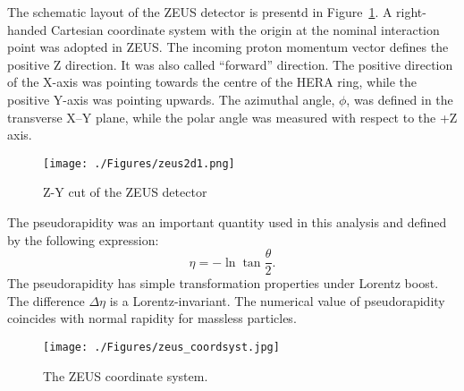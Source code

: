 The schematic layout of the ZEUS detector is presentd in Figure~\ref{fig:zeus2d1}. A right-handed Cartesian coordinate system with the origin at the nominal interaction point was adopted in ZEUS. The incoming proton momentum vector defines the positive Z direction. It was also called ``forward'' direction. The positive direction of the X-axis was pointing towards the centre of the HERA ring, while the positive Y-axis was pointing upwards. The azimuthal angle, $\phi$, was defined in the transverse X--Y plane, while the polar angle was measured with respect to the +Z axis. 
\begin{landscape}
\begin{figure}[htpb]
	\centering
		\texttt{[image: ./Figures/zeus2d1.png]}
	\caption{Z-Y cut of the ZEUS detector}
	\label{fig:zeus2d1}
\end{figure}
\end{landscape}

The pseudorapidity was an important quantity used in this analysis and defined by the following expression:
\begin{equation}
\eta = -\ln \tan \dfrac{\theta}{2}.
\end{equation}
The pseudorapidity has simple transformation properties under Lorentz boost. The difference $\Delta \eta$ is a Lorentz-invariant. The numerical value of pseudorapidity coincides with normal rapidity for massless particles.
\begin{figure}[htpb]
	\centering
		\texttt{[image: ./Figures/zeus\_coordsyst.jpg]}
	\caption{The ZEUS coordinate system.}
	\label{fig:zeus_coordsyst}
\end{figure}
